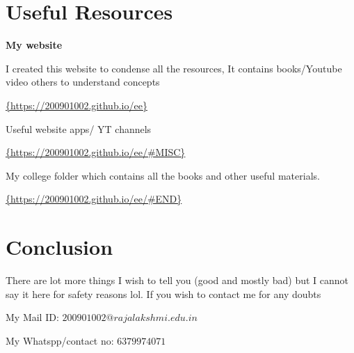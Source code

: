 \documentclass[a4paper,12pt]{article}
\begin{document}
\section{Useful Resources}

{\Large{\textbf{My website}}}

I created this website to condense all the resources, It contains books/Youtube video others to understand concepts

\url{{https://200901002.github.io/ee}} 

\vspace{0.2in}

Useful website apps/ YT channels

\url{{https://200901002.github.io/ee/#MISC}}

\vspace{0.2in}

My college folder which contains all the books and other useful materials.

\url{{https://200901002.github.io/ee/#END}}


\section{Conclusion}

There are lot more things I wish to tell you (good and mostly bad) but I cannot say it here for safety reasons lol. If you wish to contact me for any doubts 

My Mail ID: $200901002@rajalakshmi.edu.in$

My Whatspp/contact no: $6379974071$
\end{document}

